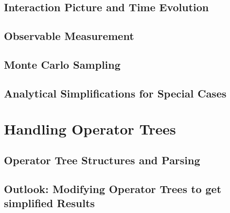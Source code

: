 \documentclass[
headings=optiontohead,              %
12pt,                               %
DIV=13,                             %
twoside=false,                      %
open=right,                         %
BCOR=00mm,                          %
toc=bibliographynumbered            %
]{scrreport}
\begin{document}
        \subsection{Interaction Picture and Time Evolution}
        \label{sec:theory-interaction-picture}
        
        \FloatBarrier

        \subsection{Observable Measurement}
        \label{sec:theory-observables}
        
        \FloatBarrier

        \subsection{Monte Carlo Sampling}
        \label{sec:theory-monte-carlo}
        
        \FloatBarrier

        \subsection{Analytical Simplifications for Special Cases}
        \label{sec:theory-special-cases}
        
        \FloatBarrier

    \section{Handling Operator Trees}
    \label{sec:theory-parsing-linting}
    
    \FloatBarrier

        \subsection{Operator Tree Structures and Parsing}
        \label{sec:theory-operator-trees}
        
        \FloatBarrier

        \subsection{Outlook: Modifying Operator Trees to get \glqq simplified\grqq{} Results}
        \label{sec:theory-operator-tree-simplification}
        
        \FloatBarrier
\end{document}
